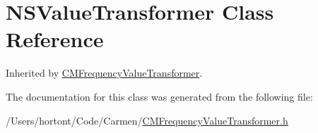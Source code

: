 \hypertarget{class_n_s_value_transformer}{
\section{NSValueTransformer Class Reference}
\label{class_n_s_value_transformer}
}
Inherited by \hyperlink{interface_c_m_frequency_value_transformer}{CMFrequencyValueTransformer}.



The documentation for this class was generated from the following file:\begin{CompactItemize}
\item 
/Users/hortont/Code/Carmen/\hyperlink{_c_m_frequency_value_transformer_8h}{CMFrequencyValueTransformer.h}\end{CompactItemize}
